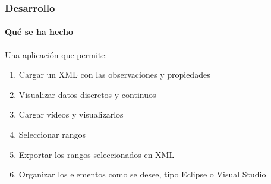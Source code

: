 \begin{frame}
	\frametitle{Desarrollo}
	\framesubtitle{Qu\'e se ha hecho}
	Una aplicaci\'on que permite:
	\begin{enumerate}
		\item Cargar un XML con las observaciones y propiedades
		\item Visualizar datos discretos y continuos
		\item Cargar v\'ideos y visualizarlos
		\item Seleccionar rangos
		\item Exportar los rangos seleccionados en XML
		\item Organizar los elementos como se desee, tipo Eclipse o Visual 
		Studio
	\end{enumerate}
	
\end{frame}


